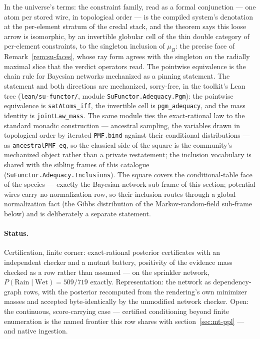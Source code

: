 In the universe's terms: the constraint family, read as a formal
conjunction --- one atom per stored wire, in topological order ---
is the compiled system's denotation at the per-element stratum of
the credal stack, and the theorem says this loose arrow is
isomorphic, by an invertible globular cell of the thin double
category of per-element constraints, to the singleton inclusion of
$\mu_B$: the precise face of Remark~\ref{rem:su-faces}, whose ray
form agrees with the singleton on the radially maximal slice that
the verdict operators read. The pointwise equivalence is the chain
rule for Bayesian networks mechanized as a pinning statement. The
statement and both directions are mechanized, sorry-free, in the
toolkit's Lean tree (\texttt{lean/su-functor/}, module
\texttt{SuFunctor.Adequacy.Pgm}): the pointwise equivalence is
\texttt{satAtoms\_iff}, the invertible cell is
\texttt{pgm\_adequacy}, and the mass identity is
\texttt{jointLaw\_mass}. The same module ties the exact-rational
law to the standard monadic construction --- ancestral sampling,
the variables drawn in topological order by iterated
\texttt{PMF.bind} against their conditional distributions --- as
\texttt{ancestralPMF\_eq}, so the classical side of the square is
the community's mechanized object rather than a private
restatement; the inclusion vocabulary is shared with the sibling
frames of this catalogue
(\texttt{SuFunctor.Adequacy.Inclusions}). The square covers the
conditional-table face of the species --- exactly the
Bayesian-network sub-frame of this section; potential wires carry
no normalization row, so their inclusion routes through a global
normalization fact (the Gibbs distribution of the Markov-random-field
sub-frame below) and is deliberately a separate statement.

\paragraph{Status.} Certification, finite corner: exact-rational
posterior certificates with an independent checker and a mutant
battery, positivity of the evidence mass checked as a row rather
than assumed --- on the sprinkler network,
$P(\mathrm{Rain} \mid \mathrm{Wet}) = 509/719$ exactly.
Representation: the network as dependency-graph rows, with the
posterior recomputed from the rendering's own minimizer masses
\cite{richardson23} and accepted byte-identically by the unmodified
network checker. Open:
the continuous, score-carrying case --- certified conditioning
beyond finite enumeration is the named frontier this row shares with
section~\ref{sec:mt-ppl} --- and native ingestion.

